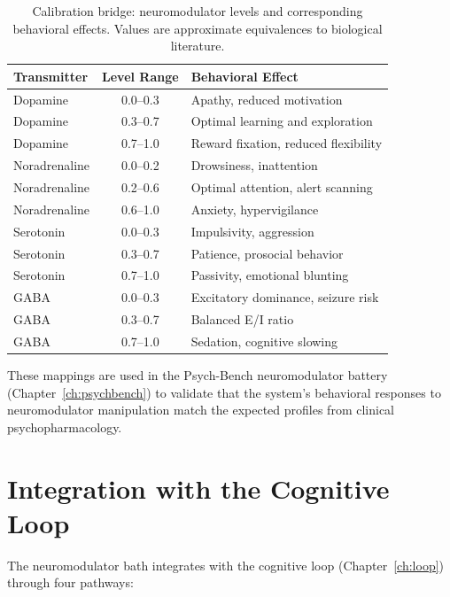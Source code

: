 \documentclass[12pt]{book}
\begin{document}
\begin{table}[H]
\centering
\caption{Calibration bridge: neuromodulator levels and corresponding behavioral effects. Values are approximate equivalences to biological literature.}
\label{tab:calibration-bridge}
\begin{tabular}{lcl}
\toprule
\textbf{Transmitter} & \textbf{Level Range} & \textbf{Behavioral Effect} \\
\midrule
Dopamine & 0.0--0.3 & Apathy, reduced motivation \\
Dopamine & 0.3--0.7 & Optimal learning and exploration \\
Dopamine & 0.7--1.0 & Reward fixation, reduced flexibility \\
Noradrenaline & 0.0--0.2 & Drowsiness, inattention \\
Noradrenaline & 0.2--0.6 & Optimal attention, alert scanning \\
Noradrenaline & 0.6--1.0 & Anxiety, hypervigilance \\
Serotonin & 0.0--0.3 & Impulsivity, aggression \\
Serotonin & 0.3--0.7 & Patience, prosocial behavior \\
Serotonin & 0.7--1.0 & Passivity, emotional blunting \\
GABA & 0.0--0.3 & Excitatory dominance, seizure risk \\
GABA & 0.3--0.7 & Balanced E/I ratio \\
GABA & 0.7--1.0 & Sedation, cognitive slowing \\
\bottomrule
\end{tabular}
\end{table}

These mappings are used in the Psych-Bench neuromodulator battery (Chapter~\ref{ch:psychbench}) to validate that the system's behavioral responses to neuromodulator manipulation match the expected profiles from clinical psychopharmacology.

\section{Integration with the Cognitive Loop}

The neuromodulator bath integrates with the cognitive loop (Chapter~\ref{ch:loop}) through four pathways:
\end{document}
